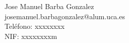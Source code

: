 Jose Manuel Barba Gonzalez \\ %
josemanuel.barbagonzalez@alum.uca.es \\ %
Teléfono: xxxxxxxx \\ %
NIF: xxxxxxxxm \\ %
